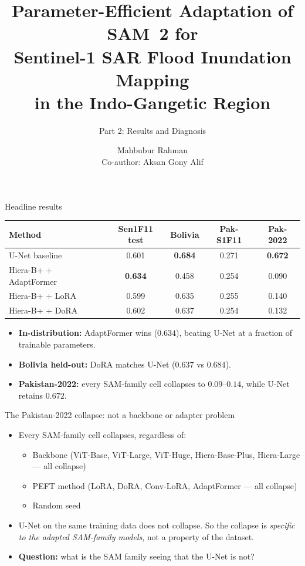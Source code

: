 \documentclass[aspectratio=169,11pt]{beamer}
\title{Parameter-Efficient Adaptation of SAM~2 for\\Sentinel-1 SAR Flood Inundation Mapping\\in the Indo-Gangetic Region}
\subtitle{Part 2: Results and Diagnosis}
\author{Mahbubur Rahman \\ {\small Co-author: Aksan Gony Alif}}
\institute{BRAC University}
\date{}
\begin{document}
\maketitle

\begin{frame}{Headline results}
\begin{center}
\small
\begin{tabular}{lcccc}
\toprule
Method & Sen1F11 test & Bolivia & Pak-S1F11 & Pak-2022 \\
\midrule
U-Net baseline                & 0.601 & \textbf{0.684} & 0.271 & \textbf{0.672} \\
Hiera-B+ + AdaptFormer        & \textbf{0.634} & 0.458 & 0.254 & \textcolor{warn}{0.090} \\
Hiera-B+ + LoRA               & 0.599 & 0.635 & 0.255 & \textcolor{warn}{0.140} \\
Hiera-B+ + DoRA               & 0.602 & 0.637 & 0.254 & \textcolor{warn}{0.132} \\
\bottomrule
\end{tabular}
\end{center}
\vspace{0.6em}
\begin{itemize}
    \item \textbf{In-distribution:} AdaptFormer wins ($0.634$), beating U-Net at a fraction of trainable parameters.
    \item \textbf{Bolivia held-out:} DoRA matches U-Net ($0.637$ vs $0.684$).
    \item \textbf{Pakistan-2022:} every SAM-family cell collapses to \textcolor{warn}{$0.09$--$0.14$}, while U-Net retains $0.672$.
\end{itemize}
\end{frame}

\begin{frame}{The Pakistan-2022 collapse: not a backbone or adapter problem}
\begin{itemize}
    \item Every SAM-family cell collapses, regardless of:
    \begin{itemize}
        \item Backbone (ViT-Base, ViT-Large, ViT-Huge, Hiera-Base-Plus, Hiera-Large --- all collapse)
        \item PEFT method (LoRA, DoRA, Conv-LoRA, AdaptFormer --- all collapse)
        \item Random seed
    \end{itemize}
    \item U-Net on the same training data does not collapse. So the collapse is \emph{specific to the adapted SAM-family models}, not a property of the dataset.
    \item \textbf{Question:} what is the SAM family seeing that the U-Net is not?
\end{itemize}
\end{frame}
\end{document}
